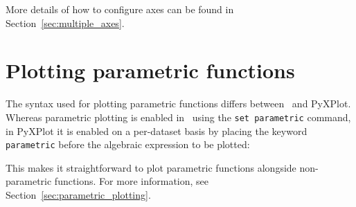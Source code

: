 \noindent More details of how to configure axes can be found in
Section~\ref{sec:multiple_axes}.

\section{Plotting parametric functions}

The syntax used for plotting parametric functions differs between \gnuplot\ and
PyXPlot. Whereas parametric plotting is enabled in \gnuplot\ using the {\tt set
parametric} command, in PyXPlot it is enabled on a per-dataset basis by placing
the keyword {\tt parametric} before the algebraic expression to be plotted:

\vspace{3mm}
\newline
{}\newline
{}
\vspace{3mm}\newline
{}\newline
{}
\vspace{3mm}

\noindent This makes it straightforward to plot parametric functions alongside
non-parametric functions. For more information, see
Section~\ref{sec:parametric_plotting}.


